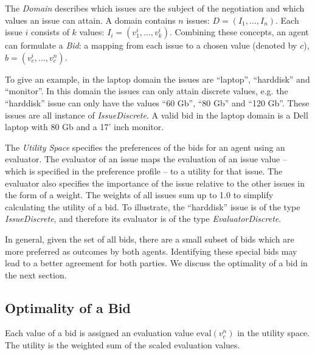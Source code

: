 \documentclass[]{article}
\begin{document}
The \textit{Domain} describes which issues are the subject of the negotiation and which values an issue can attain. A domain contains $n$ issues: $D=(I_1,\ldots,I_n)$. Each issue $i$ consists of $k$ values: $I_i=(v^i_1,\ldots,v^i_k)$.  Combining these concepts, an agent can formulate a \textit{Bid}: a mapping from each issue to a chosen value (denoted by $c$), $b=(v^i_{c},\ldots,v^n_{c})$. 

To give an example, in the laptop domain the issues are ``laptop'', ``harddisk'' and ``monitor''. In this domain the issues can only attain discrete values, e.g. the ``harddisk'' issue can only have the values ``60 Gb'', ``80 Gb'' and ``120 Gb''. These issues are all instance of \textit{IssueDiscrete}. A valid bid in the laptop domain is a Dell laptop with 80 Gb and a 17' inch monitor.

The \textit{Utility Space} specifies the preferences of the bids for an agent using an evaluator. The evaluator of an issue maps the evaluation of an issue value -- which is specified in the preference profile -- to a utility for that issue. The evaluator also specifies the importance of the issue relative to the other issues in the form of a weight. The weights of all issues sum up to 1.0 to simplify calculating the utility of a bid. To illustrate, the ``harddisk'' issue is of the type \textit{IssueDiscrete}, and therefore its evaluator is of the type \textit{EvaluatorDiscrete}.

In general, given the set of all bids, there are a small subset of bids which are more preferred as outcomes by both agents. Identifying these special bids may lead to a better agreement for both parties. We discuss the optimality of a bid in the next section.

\subsection{Optimality of a Bid}
Each value of a bid is assigned an evaluation value $\text{eval}(v^n_{c})$ in the utility space. The utility is the weighted sum of the scaled evaluation values.
\end{document}
